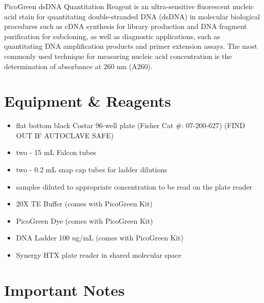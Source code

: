\documentclass[
  letterpaper,
  DIV=11,
  numbers=noendperiod]{scrreprt}
\begin{document}
PicoGreen dsDNA Quantitation Reagent is an ultra-sensitive fluorescent
nucleic acid stain for quantitating double-stranded DNA (dsDNA) in
molecular biological procedures such as cDNA synthesis for library
production and DNA fragment purification for subcloning, as well as
diagnostic applications, such as quantitating DNA amplification products
and primer extension assays. The most commonly used technique for
measuring nucleic acid concentration is the determination of absorbance
at 260 nm (A260).

\hypertarget{equipment-reagents}{%
\section*{\texorpdfstring{\textbf{Equipment \&
Reagents}}{Equipment \& Reagents}}\label{equipment-reagents}}

\begin{itemize}
\item
  flat bottom black Costar 96-well plate (Fisher Cat \#: 07-200-627)
  (FIND OUT IF AUTOCLAVE SAFE)
\item
  two - 15 mL Falcon tubes
\item
  two - 0.2 mL snap cap tubes for ladder dilutions
\item
  samples diluted to appropriate concentration to be read on the plate
  reader
\item
  20X TE Buffer (comes with PicoGreen Kit)
\item
  PicoGreen Dye (comes with PicoGreen Kit)
\item
  DNA Ladder 100 ug/mL (comes with PicoGreen Kit)
\item
  Synergy HTX plate reader in shared molecular space
\end{itemize}

\hypertarget{important-notes}{%
\section*{\texorpdfstring{\textbf{Important
Notes}}{Important Notes}}\label{important-notes}}
\end{document}
